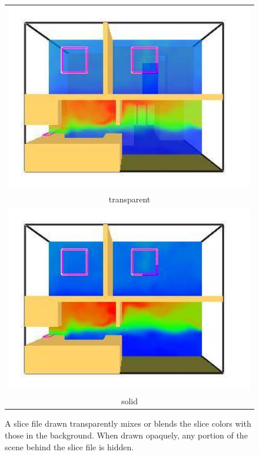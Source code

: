 \documentclass[11pt,twoside]{book}
\begin{document}
\begin{figure}[t]
\begin{center}
\begin{tabular}{c}
\includegraphics[width=5.0in]{figures/th_transparent}\\
transparent\\
\includegraphics[width=5.0in]{figures/th_solid}\\
solid\\
\end{tabular}
\end{center}
\caption {A slice file drawn transparently mixes or blends the
slice colors with those in the background.  When drawn opaquely,
any portion of the scene behind the slice file is hidden. }
\label{figtransparent}
\end{figure}
\end{document}

